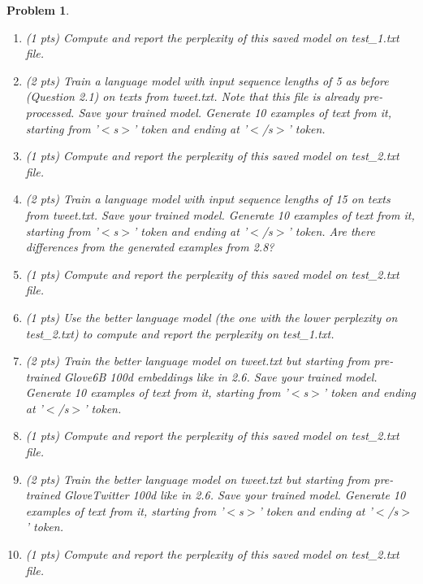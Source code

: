 \documentclass{article}
\newtheorem{problem}{Problem}
\begin{document}
\begin{problem}
\begin{enumerate}
    \item (1 pts) Compute and report the perplexity of this saved model on test\_1.txt file.
    \item (2 pts) Train a language model with input sequence lengths of 5 as before (Question 2.1) on texts from tweet.txt. Note that this file is already pre-processed. Save your trained model. Generate 10 examples of text from it, starting from '$<$s$>$' token and ending at '$<$/s$>$' token.
    \item (1 pts) Compute and report the perplexity of this saved model on test\_2.txt file.
    \item (2 pts) Train a language model with input sequence lengths of 15 on texts from tweet.txt. Save your trained model. Generate 10 examples of text from it, starting from '$<$s$>$' token and ending at '$<$/s$>$' token. Are there differences from the generated examples from 2.8?
    \item (1 pts) Compute and report the perplexity of this saved model on test\_2.txt file.
    \item (1 pts) Use the better language model (the one with the lower perplexity on test\_2.txt) to compute and report the perplexity on test\_1.txt. 
    \item (2 pts) Train the better language model on tweet.txt but starting from pre-trained Glove6B 100d embeddings like in 2.6. Save your trained model. Generate 10 examples of text from it, starting from '$<$s$>$' token and ending at '$<$/s$>$' token. 
    \item (1 pts) Compute and report the perplexity of this saved model on test\_2.txt file.
    \item (2 pts) Train the better language model on tweet.txt but starting from pre-trained GloveTwitter 100d like in 2.6. Save your trained model. Generate 10 examples of text from it, starting from '$<$s$>$' token and ending at '$<$/s$>$' token. 
    \item (1 pts) Compute and report the perplexity of this saved model on test\_2.txt file. \\
\end{enumerate}
\end{problem}
\end{document}
